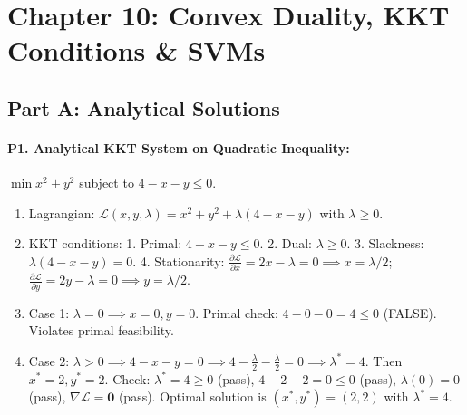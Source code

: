 \section*{Chapter 10: Convex Duality, KKT Conditions \& SVMs}

\subsection*{Part A: Analytical Solutions}

\paragraph{P1. Analytical KKT System on Quadratic Inequality:}
$\min x^2 + y^2$ subject to $4 - x - y \le 0$.
\begin{enumerate}[label=(\alph*)]
    \item Lagrangian: $\mathcal{L}(x, y, \lambda) = x^2 + y^2 + \lambda(4 - x - y)$ with $\lambda \ge 0$.
    \item KKT conditions:
    1. Primal: $4 - x - y \le 0$.
    2. Dual: $\lambda \ge 0$.
    3. Slackness: $\lambda(4 - x - y) = 0$.
    4. Stationarity: $\frac{\partial \mathcal{L}}{\partial x} = 2x - \lambda = 0 \implies x = \lambda/2$; $\frac{\partial \mathcal{L}}{\partial y} = 2y - \lambda = 0 \implies y = \lambda/2$.
    \item Case 1: $\lambda = 0 \implies x = 0, y = 0$. Primal check: $4 - 0 - 0 = 4 \le 0$ (FALSE). Violates primal feasibility.
    \item Case 2: $\lambda > 0 \implies 4 - x - y = 0 \implies 4 - \frac{\lambda}{2} - \frac{\lambda}{2} = 0 \implies \lambda^* = 4$.
    Then $x^* = 2, y^* = 2$.
    Check: $\lambda^* = 4 \ge 0$ (pass), $4 - 2 - 2 = 0 \le 0$ (pass), $\lambda(0) = 0$ (pass), $\nabla \mathcal{L} = \mathbf{0}$ (pass).
    Optimal solution is $(x^*, y^*) = (2, 2)$ with $\lambda^* = 4$.
\end{enumerate}

